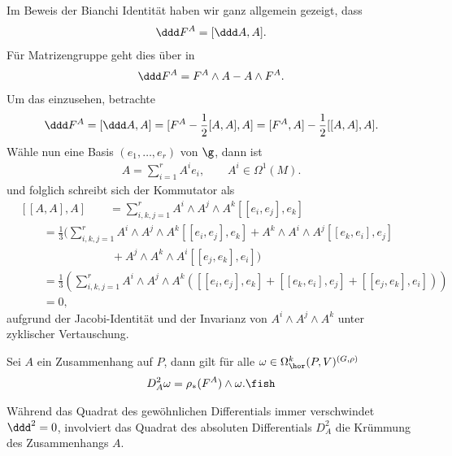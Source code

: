\documentclass[%
	paper=a5,%
	fleqn,%
	DIV=18,%
	BCOR=0mm,
	fontsize=11pt,
	titlepage=false,%
	bibliography=totoc,
	DIV=18,%
	twoside=true,
	pdftitle=Riemannsche Geometrie,
	pdfauthor=Uwe Semmelmann,
	numbers=noendperiod]%
	{scrbook}
\begin{document}
\begin{rem}
Im Beweis der Bianchi Identität haben wir ganz allgemein gezeigt, dass
\begin{align*}
\ddd F^A = [\ddd A,A].
\end{align*}
Für Matrizengruppe geht dies über in
\begin{align*}
\ddd F^A = F^A\wedge A - A\wedge F^A.
\end{align*}
Um das einzusehen, betrachte
\begin{align*}
\ddd F^A = [\ddd A ,A] = [F^A - \frac{1}{2}[A,A],A]
= [F^A,A] - \frac{1}{2}[[A,A],A].
\end{align*}
Wähle nun eine Basis $(e_1,\ldots,e_r)$ von $\g$, dann ist 
\begin{align*}
A = \sum_{i=1}^r A^i e_i,\qquad A^i\in\Omega^1(M).
\end{align*}
und folglich schreibt sich der Kommutator als
\begin{align*}
&[[A,A],A] 
\qquad= \sum_{i,k,j=1}^r A^i\!\wedge\! A^j\! \wedge\! A^k [[e_i,e_j],e_k]\\
&\qquad= \frac{1}{3}\Biggl(\sum_{i,k,j=1}^r A^i\!\wedge\! A^j\! \wedge\! A^k
[[e_i,e_j],e_k]+ A^k\!\wedge\! A^i\! \wedge\! A^j [[e_k,e_i],e_j]\\
&\qquad\qquad\qquad\qquad+
A^j\!\wedge\! A^k\! \wedge\! A^i [[e_j,e_k],e_i]
\Biggr)\\ 
&\qquad= \frac{1}{3}\left(\sum_{i,k,j=1}^r A^i\!\wedge\! A^j\! \wedge\!
A^k\left( [[e_i,e_j],e_k]+
 [[e_k,e_i],e_j]+
 [[e_j,e_k],e_i]\right)
\right) \\ &\qquad= 0,
\end{align*}
aufgrund der Jacobi-Identität und der Invarianz von $A^i\wedge A^j\wedge
A^k$ unter zyklischer Vertauschung.\map
\end{rem}

\begin{prop}
Sei $A$ ein Zusammenhang auf $P$, dann gilt für alle
$\omega\in\Omega_\hor^k(P,V)^{(G,\rho)}$
\begin{align*}
D_A^2 \omega = \rho_*(F^A)\wedge \omega.\fish
\end{align*}
\end{prop}

Während das Quadrat des gewöhnlichen Differentials immer verschwindet $\ddd^2
= 0$, involviert das Quadrat des absoluten Differentials $D_A^2$ die Krümmung
des Zusammenhangs $A$.
\end{document}
